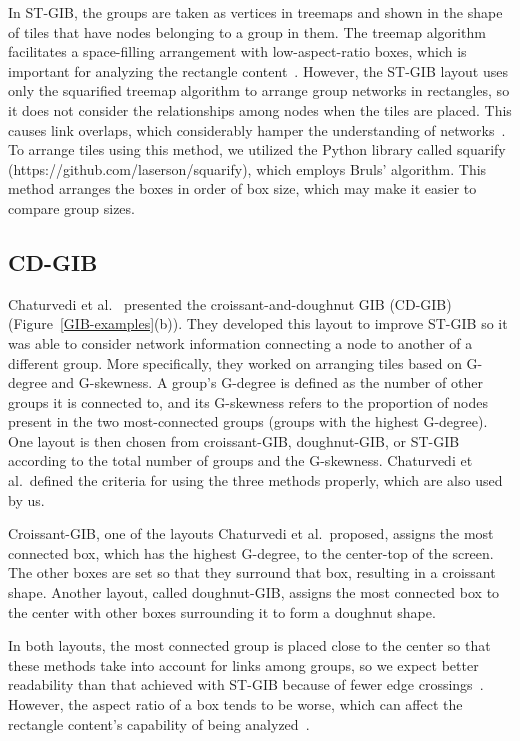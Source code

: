 \documentclass[review]{vgtc}                 %
\begin{document}
In ST-GIB, the groups are taken as vertices in treemaps and shown in the shape of tiles that have nodes belonging to a group in them.
The treemap algorithm facilitates a space-filling arrangement with low-aspect-ratio boxes, which is important for analyzing the rectangle content~\cite{bruls2000squarified}.
However, the ST-GIB layout uses only the squarified treemap algorithm to arrange group networks in rectangles, so it does not consider the relationships among nodes when the tiles are placed.
This causes link overlaps, which considerably hamper the understanding of networks~\cite{468391,purchase1997aesthetic,purchase1998performance,purchase2002empirical}.
To arrange tiles using this method, we utilized the Python library called squarify (https://github.com/laserson/squarify), which employs Bruls' algorithm. This method arranges the boxes in order of box size, which may make it easier to compare group sizes.

\subsection{CD-GIB}
Chaturvedi et al.~\cite{chaturvedi2014group} presented the croissant-and-doughnut GIB (CD-GIB) (Figure~\ref{GIB-examples}(b)).
They developed this layout to improve ST-GIB so it was able to consider network information connecting a node to another of a different group.
More specifically, they worked on arranging tiles based on G-degree and G-skewness.
A group's G-degree is defined as the number of other groups it is connected to, and its G-skewness refers to the proportion of nodes present in the two most-connected groups (groups with the highest G-degree).
One layout is then chosen from croissant-GIB, doughnut-GIB, or ST-GIB according to the total number of groups and the G-skewness.
Chaturvedi et al.\ defined the criteria for using the three methods properly, which are also used by us.

Croissant-GIB, one of the layouts Chaturvedi et al.\ proposed, assigns the most connected box, which has the highest G-degree, to the center-top of the screen. The other boxes are set so that they surround that box, resulting in a croissant shape. Another layout, called doughnut-GIB, assigns the most connected box to the center with other boxes surrounding it to form a doughnut shape.

In both layouts, the most connected group is placed close to the center so that these methods take into account for links among groups, so we expect better readability than that achieved with ST-GIB because of fewer edge crossings~\cite{468391,purchase1997aesthetic,purchase1998performance,purchase2002empirical}.
However, the aspect ratio of a box tends to be worse, which can affect the rectangle content's capability of being analyzed~\cite{bruls2000squarified}.
\end{document}
